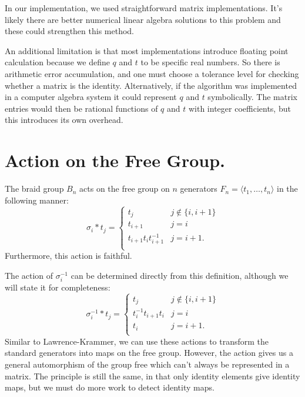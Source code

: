 \documentclass[12pt]{thesis}
\begin{document}
In our implementation, we used straightforward matrix implementations.
It's likely there are better numerical linear algebra solutions
to this problem and these could strengthen this method.

An additional limitation is that most implementations introduce floating point
calculation because we define $q$ and $t$ to be specific real 
numbers. 
So there is arithmetic error accumulation, and one must choose
a tolerance level for checking whether a matrix is the identity.
Alternatively, if the algorithm was implemented in a computer algebra system
it could represent $q$ and $t$ symbolically.
The matrix entries would then be rational functions of $q$ and $t$ with integer
coefficients, but this introduces its own overhead.

\section{Action on the Free Group.}

\begin{proposition}
\cite{action-on-free-group}
The braid group $B_{n}$ acts on the free group
on $n$ generators $F_{n} = \langle t_{1}, \ldots, t_{n} \rangle$ in the following manner:
\[
    \sigma_{i} * t_{j} =
    \begin{cases}
        t_{j} & j \not\in \{ i, i + 1 \} \\
        t_{i+1} & j = i \\
        t_{i + 1}t_{i}t_{i + 1}^{-1} & j = i + 1. \\
    \end{cases}
\]
    Furthermore, this action is faithful. 
\end{proposition}

The action of $\sigma_{i}^{-1}$ can be determined directly from this definition,
although we will state it for completeness:
\[
    \sigma_{i}^{-1} * t_{j} =
    \begin{cases}
        t_{j} & j \not\in \{ i, i + 1 \} \\
        t_{i}^{-1}t_{i+1}t_{i} & j = i \\
        t_{i} & j = i + 1. \\
    \end{cases}
\]
Similar to Lawrence-Krammer, we can use these actions
to transform the standard generators into maps on the free group.
However, the action
gives us a general automorphism of the group free which can't always be represented in a matrix.
The principle is still the same, in that only identity
elements give identity maps,
but we must do more work to detect identity maps.
\end{document}
